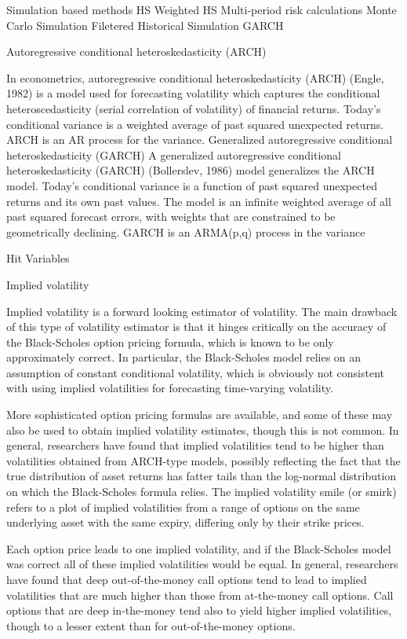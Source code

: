 Simulation based methods
HS
Weighted HS
Multi-period risk calculations
Monte Carlo Simulation
Filetered Historical Simulation
GARCH 

Autoregressive conditional heteroskedasticity (ARCH)

In econometrics, autoregressive conditional heteroskedasticity (ARCH) (Engle, 1982) is a model used for forecasting volatility which captures the conditional heteroscedasticity (serial correlation of volatility) of financial returns. Today's conditional variance is a weighted average of past squared unexpected returns. ARCH is an AR process for the variance.
Generalized autoregressive conditional heteroskedasticity (GARCH)
A generalized autoregressive conditional heteroskedasticity (GARCH) (Bollerslev, 1986) model generalizes the ARCH model. Today's conditional variance is a function of past squared unexpected returns and its own past values. The model is an infinite weighted average of all past squared forecast errors, with weights that are constrained to be geometrically declining. GARCH is an ARMA(p,q) process in the variance


Hit Variables

Implied volatility

Implied volatility is a forward looking estimator of volatility. The main drawback of this type of volatility estimator is that it hinges critically on the accuracy of the Black-Scholes option pricing formula, which is known to be only approximately correct. In particular, the Black-Scholes model relies on an assumption of constant conditional volatility, which is obviously not consistent with using implied volatilities for forecasting time-varying volatility. 

More sophisticated option pricing formulas are available, and some of these may also be used to obtain implied volatility estimates, though this is not common. In general, researchers have found that implied volatilities tend to be higher than volatilities obtained from ARCH-type models, possibly reﬂecting the fact that the true distribution of asset returns has fatter tails than the log-normal distribution on which the Black-Scholes formula relies. The implied volatility smile (or smirk) refers to a plot of implied volatilities from a range of options on the same underlying asset with the same expiry, diﬀering only by their strike prices. 

Each option price leads to one implied volatility, and if the Black-Scholes model was correct all of these implied volatilities would be equal. In general,
researchers have found that deep out-of-the-money call options tend to lead to implied volatilities that are much higher than those from at-the-money call options. Call options that are deep in-the-money tend also to yield higher implied volatilities, though to a lesser extent than for out-of-the-money options.

